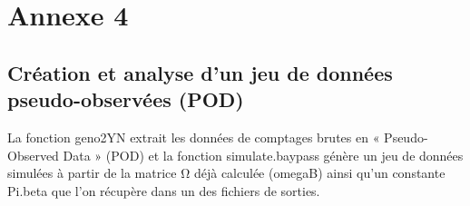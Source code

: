 \documentclass[
  openany]{book}
\newenvironment{Shaded}{\begin{snugshade}}{\end{snugshade}}
\newcommand{\AttributeTok}[1]{\textcolor[rgb]{0.13,0.29,0.53}{#1}}
\newcommand{\CommentTok}[1]{\textcolor[rgb]{0.56,0.35,0.01}{\textit{#1}}}
\newcommand{\FunctionTok}[1]{\textcolor[rgb]{0.13,0.29,0.53}{\textbf{#1}}}
\newcommand{\NormalTok}[1]{#1}
\newcommand{\StringTok}[1]{\textcolor[rgb]{0.31,0.60,0.02}{#1}}
\newcommand{\VariableTok}[1]{\textcolor[rgb]{0.00,0.00,0.00}{#1}}
\theoremstyle{definition}
\theoremstyle{definition}
\theoremstyle{definition}
\theoremstyle{definition}
\theoremstyle{remark}
\begin{document}
\begin{Shaded}
\end{Shaded}

\hypertarget{An4}{%
\section*{Annexe 4}\label{An4}}

\hypertarget{cruxe9ation-et-analyse-dun-jeu-de-donnuxe9es-pseudo-observuxe9es-pod}{%
\subsection*{Création et analyse d'un jeu de données pseudo-observées (POD)}\label{cruxe9ation-et-analyse-dun-jeu-de-donnuxe9es-pseudo-observuxe9es-pod}}

La fonction geno2YN extrait les données de comptages brutes en « Pseudo-Observed Data » (POD) et la fonction simulate.baypass génère un jeu de données simulées à partir de la matrice Ω déjà calculée (omegaB) ainsi qu'un constante Pi.beta que l'on récupère dans un des fichiers de sorties.
\end{document}
